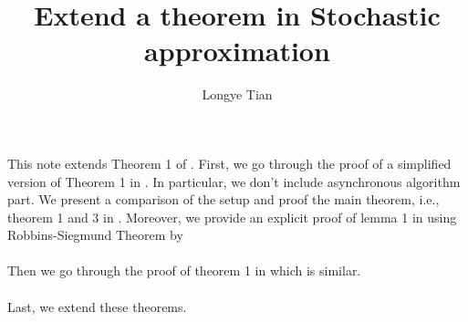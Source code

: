 
\title{Extend a theorem in Stochastic approximation}
\author{Longye Tian}

\maketitle
This note extends Theorem 1 of \cite{tsitsiklis1994asynchronous}. First, we go through the proof of a simplified version of Theorem 1 in \cite{tsitsiklis1994asynchronous}. In particular, we don't include asynchronous algorithm part. We present a comparison of the setup and proof the main theorem, i.e., theorem 1 and 3 in \cite{tsitsiklis1994asynchronous}. Moreover, we provide an explicit proof of lemma 1 in \cite{tsitsiklis1994asynchronous} using Robbins-Siegmund Theorem by \cite{robbins1971convergence}\\
\\
Then we go through the proof of theorem 1 in \cite{jaakkola1993convergence} which is similar.\\
\\
Last, we extend these theorems.
\tableofcontents
\newpage









